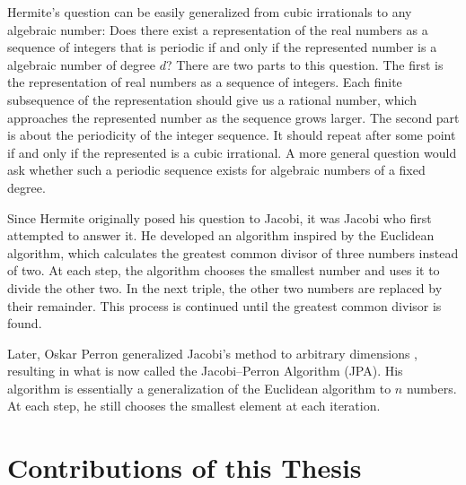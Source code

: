 Hermite's question can be easily generalized from cubic irrationals to any algebraic number:
Does there exist a representation of the real numbers as a sequence of
integers that is periodic if and only if the represented number is a algebraic number of degree $d$?
There are two parts to this question.
The first is the representation of real numbers as a sequence of integers.
Each finite subsequence of the representation should give us a rational number,
which approaches the represented number as the sequence grows larger.
The second part is about the periodicity of the integer sequence.
It should repeat after some point if and only if the represented is a cubic irrational.
A more general question would ask whether such a periodic sequence exists for
algebraic numbers of a fixed degree.

Since Hermite originally posed his question to Jacobi, it was Jacobi who first attempted to answer it.
He developed an algorithm inspired by the Euclidean algorithm,
which calculates the greatest common divisor of three numbers instead of two.
At each step,
the algorithm chooses the smallest number and uses it to divide the other two.
In the next triple, the other two numbers are replaced by their remainder.
This process is continued until the greatest common divisor is found.

Later, Oskar Perron generalized Jacobi's method to arbitrary dimensions \cite{Perron07},
resulting in what is now called the Jacobi–Perron Algorithm (JPA).
His algorithm is essentially a generalization of the Euclidean algorithm to $n$ numbers.
At each step, he still chooses the smallest element at each iteration.


\section{Contributions of this Thesis}

